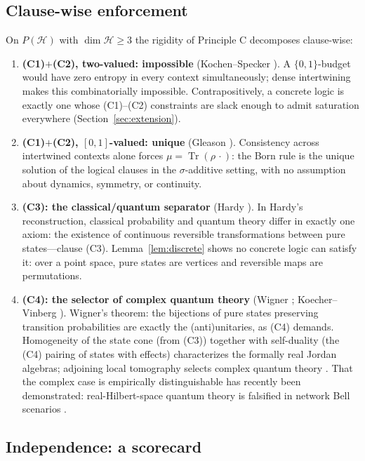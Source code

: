 \documentclass[11pt]{article}
\theoremstyle{definition}
\theoremstyle{remark}
\newcommand{\Hi}{\mathcal{H}}
\newcommand{\PH}{P(\Hi)}
\newcommand{\Tr}{\operatorname{Tr}}
\begin{document}
\subsection{Clause-wise enforcement}\label{subsec:rigidity}

On $\PH$ with $\dim\Hi\ge3$ the rigidity of Principle C decomposes
clause-wise:

\begin{enumerate}
\item \textbf{(C1)$+$(C2), two-valued: impossible} (Kochen--Specker
\cite{KochenSpecker1967}). A $\{0,1\}$-budget would have zero entropy in
every context simultaneously; dense intertwining makes this
combinatorially impossible. Contrapositively, a concrete logic is
exactly one whose (C1)--(C2) constraints are slack enough to admit
saturation everywhere (Section~\ref{sec:extension}).
\item \textbf{(C1)$+$(C2), $[0,1]$-valued: unique} (Gleason
\cite{Gleason1957}). Consistency across intertwined contexts alone
forces $\mu=\Tr(\rho\,\cdot)$: the Born rule is the unique solution of
the logical clauses in the $\sigma$-additive setting, with no assumption
about dynamics, symmetry, or continuity.
\item \textbf{(C3): the classical/quantum separator} (Hardy
\cite{Hardy2001}). In Hardy's reconstruction, classical probability and
quantum theory differ in exactly one axiom: the existence of continuous
reversible transformations between pure states---clause (C3).
Lemma~\ref{lem:discrete} shows no concrete logic can satisfy it: over a
point space, pure states are vertices and reversible maps are
permutations.
\item \textbf{(C4): the selector of complex quantum theory} (Wigner
\cite{Bargmann1964}; Koecher--Vinberg \cite{FarautKoranyi1994}).
Wigner's theorem: the bijections of pure states preserving transition
probabilities are exactly the (anti)unitaries, as (C4) demands.
Homogeneity of the state cone (from (C3)) together with self-duality
(the (C4) pairing of states with effects) characterizes the formally
real Jordan algebras; adjoining local tomography selects complex
quantum theory
\cite{Hardy2001,DakicBrukner2011,MasanesMuller2011,%
ChiribellaDArianoPerinotti2011}. That the complex case is empirically
distinguishable has recently been demonstrated: real-Hilbert-space
quantum theory is falsified in network Bell scenarios \cite{Renou2021}.
\end{enumerate}

\subsection{Independence: a scorecard}\label{subsec:scorecard}
\end{document}
